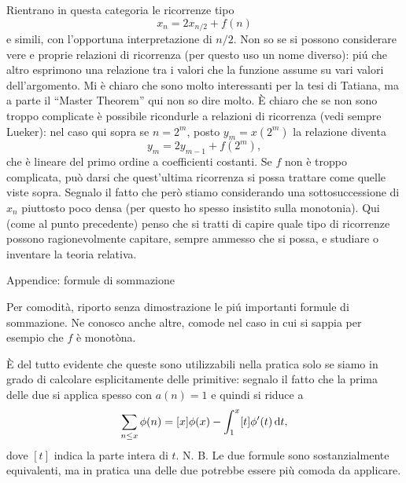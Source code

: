 \documentclass{article}[12]
\begin{document}
\bigskip
{}
\bigskip\noindent
Rientrano in questa categoria le ricorrenze tipo 
$$
x_n = 2 x_{n/2} + f(n)
$$
e simili, con l'opportuna interpretazione di $n/2$. Non so se si
possono considerare vere e proprie 
relazioni di ricorrenza (per questo uso un nome diverso): pi\'u che
altro esprimono una relazione 
tra i valori che la funzione assume su vari valori dell'argomento. Mi
\`e chiaro che sono molto 
interessanti per la tesi di Tatiana, ma a parte il ``Master Theorem''
qui non so dire molto. 
\`E chiaro che se non sono troppo complicate \`e possibile ricondurle
a relazioni di ricorrenza 
(vedi sempre Lueker): nel caso qui sopra se $n=2^m$, posto
$y_m=x(2^m)$ la relazione diventa
$$
y_m = 2 y_{m-1} + f(2^m),
$$
che \`e lineare del primo ordine a coefficienti costanti. Se $f$ non
\`e troppo complicata, pu\`o 
darsi che quest'ultima ricorrenza si possa trattare come quelle viste
sopra. Segnalo il fatto 
che per\`o stiamo considerando una sottosuccessione di $x_n$ piuttosto
poco densa (per questo 
ho spesso insistito sulla monotonia). Qui (come al punto precedente)
penso che si tratti di 
capire quale tipo di ricorrenze possono ragionevolmente capitare,
sempre ammesso che si possa, 
e studiare o inventare la teoria relativa. 

\bigskip
\centerline{Appendice: formule di sommazione} 
\bigskip
\noindent
Per comodit\`a, riporto senza dimostrazione le pi\'u importanti
formule di sommazione. 
Ne conosco anche altre, comode nel caso in cui si sappia per esempio
che $f$ \`e monot\`ona. 


\noindent{\bf Teorema (Formula di Sommazione di Euler-McLaurin). }{\sl
Sia $f\colon(x,y]\to\C$ una qualunque funzione derivabile. 
Si ha 
$$
\sum_{x<n\le y} f(n) = \int_x^y f(t) \, \dx t + \int_x^y \{t\} f'(t)
\, \dx t
- \{y\}f(y) + \{x\} f(x),
$$
dove $\{x\}$ indica la parte frazionaria del numero reale $x$.}

\`E del tutto evidente che queste sono utilizzabili nella pratica solo
se siamo in grado di 
calcolare esplicitamente delle primitive: segnalo il fatto che la
prima delle due si applica 
spesso con $a(n)=1$ e quindi si riduce a 
$$
\sum_{n\le x} \phi(n) = [x]\phi(x) - \int_1^x [t] \phi'(t) \, {\rm d} t,
$$
dove $[t]$ indica la parte intera di $t$. N. B. Le due formule sono
sostanzialmente equivalenti, 
ma in pratica una delle due potrebbe essere pi\`u comoda da applicare.
\end{document}

